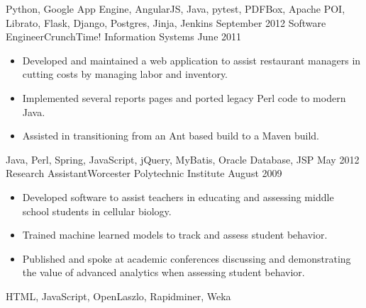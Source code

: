 \begin{experiences}
{\begin{itemize}
                      \end{itemize}
                  }
                  {Python, Google App Engine, AngularJS, Java, pytest, PDFBox, Apache POI, Librato, Flask, Django, Postgres, Jinja, Jenkins}
\emptySeparator
  \experience
  {September 2012}  {Software Engineer}{CrunchTime! Information Systems}
  {June 2011}   {
                      \begin{itemize}
                        \item Developed and maintained a web application to assist restaurant managers in cutting costs by managing labor and inventory.
                        \item Implemented several reports pages and ported legacy Perl code to modern Java.   
                        \item Assisted in transitioning from an Ant based build to a Maven build.
                      \end{itemize}
                  }
                  {Java, Perl, Spring, JavaScript, jQuery, MyBatis, Oracle Database, JSP}
\emptySeparator
\experience
  {May 2012}  {Research Assistant}{Worcester Polytechnic Institute}
  {August 2009}   {
                      \begin{itemize}
                        \item Developed software to assist teachers in educating and assessing middle school students in cellular biology.                                          
                        \item Trained machine learned models to track and assess student behavior.    
                        \item Published and spoke at academic conferences discussing and demonstrating the value of advanced analytics when assessing student behavior.
                      \end{itemize}
                  }
                  {HTML, JavaScript, OpenLaszlo, Rapidminer, Weka}  
\end{experiences}

